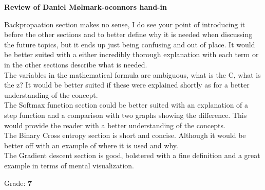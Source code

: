 \documentclass{article}
\begin{document}
\begin{center}
	\textbf{Review of Daniel Mølmark-oconnors hand-in}\\
\end{center}

Backpropaation section makes no sense, I do see your point of introducing it before the other sections and to better define why it is needed when discussing the future topics, but it ends up just being confusing and out of place. It would be better suited with a either incredibly thorough explanation with each term or in the other sections describe what is needed.\\

The variables in the mathematical formula are ambiguous, what is the C, what is the z? It would be better suited if these were explained shortly as for a better understanding of the concept.\\

The Softmax function section could be better suited with an explanation of a step function and a comparison with two graphs showing the difference. This would provide the reader with a better understanding of the concepts.\\

The Binary Cross entropy section is short and concise. Although it would be better off with an example of where it is used and why.\\

The Gradient descent section is good, bolstered with a fine definition and a great example in terms of mental visualization.

\begin{center}
	Grade: \textbf{7}
\end{center}
\end{document}
